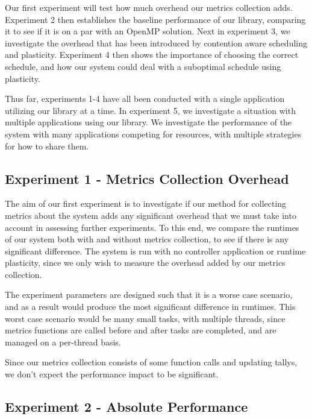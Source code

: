 Our first experiment will test how much overhead our metrics collection adds. Experiment 2 then establishes the baseline performance of our library, comparing it to see if it is on a par with an OpenMP solution. Next in experiment 3, we investigate the overhead that has been introduced by contention aware scheduling and plasticity. Experiment 4 then shows the importance of choosing the correct schedule, and how our system could deal with a suboptimal schedule using plasticity.

Thus far, experiments 1-4 have all been conducted with a single application utilizing our library at a time. In experiment 5, we investigate a situation with multiple applications using our library. We investigate the performance of the system with many applications competing for resources, with multiple strategies for how to share them.



\subsection{Experiment 1 - Metrics Collection Overhead}

The aim of our first experiment is to investigate if our method for collecting metrics about the system adds any significant overhead that we must take into account in assessing further experiments. To this end, we compare the runtimes of our system both with and without metrics collection, to see if there is any significant difference. The system is run with no controller application or runtime plasticity, since we only wish to measure the overhead added by our metrics collection. 

The experiment parameters are designed such that it is a worse case scenario, and as a result would produce the most significant difference in runtimes. This worst case scenario would be many small tasks, with multiple threads, since metrics functions are called before and after tasks are completed, and are managed on a per-thread basis.

Since our metrics collection consists of some function calls and updating tallys, we don't expect the performance impact to be significant. 





\subsection{Experiment 2 - Absolute Performance}

